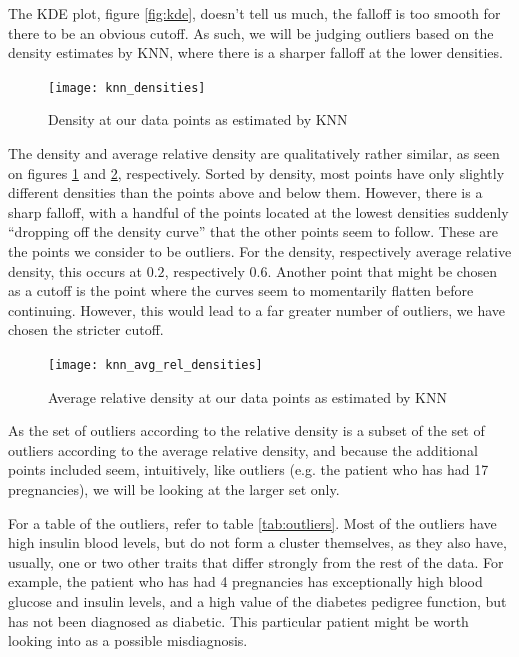 The KDE plot, figure \ref{fig:kde},
doesn't tell us much,
the falloff is too smooth
for there to be an obvious cutoff.
As such,
we will be judging outliers based on the
density estimates by KNN,
where there is a sharper falloff at the lower densities.

\begin{figure}[htbp]
  \centering
  \texttt{[image: knn\_densities]}
  \caption{Density at our data points as estimated by KNN}
  \label{fig:knn}
\end{figure}

The density and average relative density are qualitatively rather similar,
as seen on figures \ref{fig:knn} and \ref{fig:knn-avg-rel}, respectively.
Sorted by density,
most points have only slightly different densities than the points
above and below them.
However, there is a sharp falloff,
with a handful of the points located at the lowest densities
suddenly ``dropping off the density curve''
that the other points seem to follow.
These are the points we consider to be outliers.
For the density, respectively average relative density,
this occurs at $0.2$, respectively $0.6$.
Another point that might be chosen as a cutoff is
the point where the curves seem to momentarily flatten before continuing.
However, this would lead to a far greater number of outliers,
we have chosen the stricter cutoff.

\begin{figure}[htbp]
  \centering
  \texttt{[image: knn\_avg\_rel\_densities]}
  \caption{Average relative density at our data points as estimated by KNN}
  \label{fig:knn-avg-rel}
\end{figure}

As the set of outliers according to the relative density
is a subset of
the set of outliers according to the average relative density,
and because the additional points included seem, intuitively, like outliers
(e.g. the patient who has had 17 pregnancies),
we will be looking at the larger set only.

For a table of the outliers, refer to table \ref{tab:outliers}.
Most of the outliers have high insulin blood levels,
but do not form a cluster themselves,
as they also have, usually,
one or two other traits that differ strongly from the rest of the data.
For example,
the patient who has had 4 pregnancies
has exceptionally high blood glucose
and insulin levels,
and a high value of the diabetes pedigree function,
but has not been diagnosed as diabetic.
This particular patient might be worth looking into as a possible misdiagnosis.

